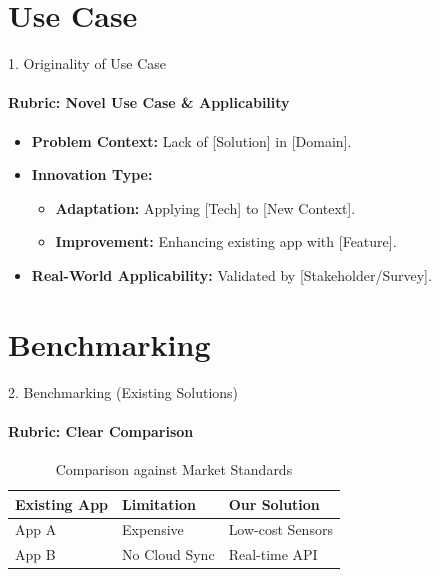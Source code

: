 \documentclass[aspectratio=169, 11pt]{beamer}
\begin{document}
\section{Use Case}
\begin{frame}{1. Originality of Use Case}
    \framesubtitle{Rubric: Novel Use Case \& Applicability}
    \begin{itemize}
        \item \textbf{Problem Context:} Lack of [Solution] in [Domain].
        \item \textbf{Innovation Type:}
        \begin{itemize}
            \item \textbf{Adaptation:} Applying [Tech] to [New Context].
            \item \textbf{Improvement:} Enhancing existing app with [Feature].
        \end{itemize}
        \item \textbf{Real-World Applicability:} Validated by [Stakeholder/Survey].
    \end{itemize}
\end{frame}

\section{Benchmarking}
\begin{frame}{2. Benchmarking (Existing Solutions)}
    \framesubtitle{Rubric: Clear Comparison}
    \begin{table}
        \centering
        \small
        \begin{tabular}{l l l}
            \toprule
            \textbf{Existing App} & \textbf{Limitation} & \textbf{Our Solution} \\
            \midrule
            App A & Expensive & Low-cost Sensors \\
            App B & No Cloud Sync & Real-time API \\
            \bottomrule
        \end{tabular}
        \caption{Comparison against Market Standards}
    \end{table}
\end{frame}

\end{document}
